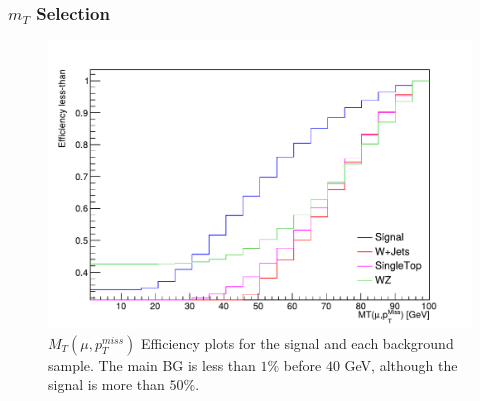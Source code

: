 \documentclass{beamer}
\begin{document}
\begin{frame}
\frametitle{$m_T$ Selection}
\begin{figure}[!h]

\centering
\includegraphics[scale=0.45]{pictures/Selection/m_T/Eff-m_T}
\caption{{\scriptsize $M_T(\mu,p^{miss}_T)$ Efficiency plots for the signal and each background sample. The main BG is less than $1\%$ before $40$ GeV, although the signal is more than $50\%$.}}
\label{Eff-m_T}

\end{figure}


\end{frame}

\end{document}
